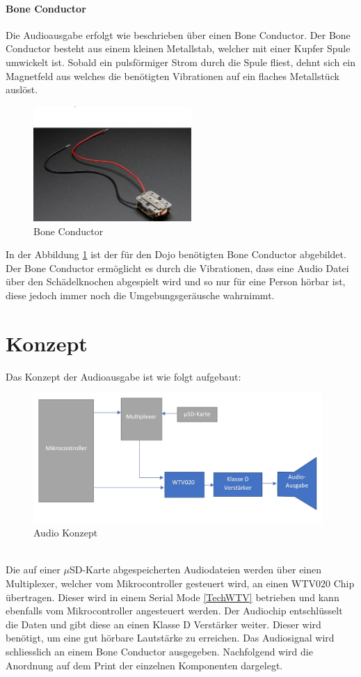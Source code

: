 \paragraph{Bone Conductor}
Die Audioausgabe erfolgt wie beschrieben über einen Bone Conductor. Der Bone Conductor besteht aus einem kleinen Metallstab, welcher mit einer Kupfer Spule umwickelt ist. Sobald ein pulsförmiger Strom durch die Spule fliest, dehnt sich ein Magnetfeld aus welches die benötigten Vibrationen auf ein flaches Metallstück auslöst. 
\begin{figure}[h]
	\centering
	\includegraphics[width=6cm]{Bilder/Bone-Conductor.jpg}
	\caption{Bone Conductor \cite{BoneConductor}}
	\label{Bone-Conductor}
\end{figure}

In der Abbildung \ref{Bone-Conductor} ist der für den Dojo benötigten Bone Conductor abgebildet. Der Bone Conductor ermöglicht es durch die Vibrationen, dass eine Audio Datei über den Schädelknochen abgespielt wird und so nur für eine Person hörbar ist, diese jedoch immer noch die Umgebungsgeräusche wahrnimmt. \cite{BoneConductor}



\section{Konzept}\label{AudioKonzept}
Das Konzept der Audioausgabe ist wie folgt aufgebaut:
\begin{figure}[h]
	\centering
	\includegraphics[width=11cm]{Bilder/Audio-Konzept.jpg}
	\caption{Audio Konzept}
	\label{Audio-Konzept}
\end{figure}\\
Die auf einer $\mu$SD-Karte abgespeicherten Audiodateien werden über einen Multiplexer, welcher vom Mikrocontroller gesteuert wird, an einen WTV020 Chip übertragen. Dieser wird in einem Serial Mode \ref{TechWTV} betrieben und kann ebenfalls vom Mikrocontroller angesteuert werden. Der Audiochip entschlüsselt die Daten und gibt diese an einen Klasse D Verstärker weiter. Dieser wird benötigt, um eine gut hörbare Lautstärke zu erreichen. Das Audiosignal wird schliesslich an einem Bone Conductor ausgegeben. 
Nachfolgend wird die Anordnung auf dem Print der einzelnen Komponenten dargelegt. 
